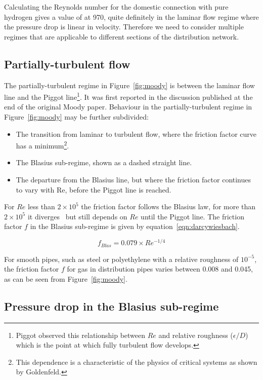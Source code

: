 \documentclass[5p]{elsarticle} %
\begin{document}
Calculating the Reynolds number for the domestic connection with pure hydrogen gives a value of at 970, quite definitely in the laminar flow regime where the pressure drop is linear in velocity.
Therefore we need to consider multiple regimes that are applicable to different sections of the distribution network.

\subsection{Partially-turbulent flow}

The partially-turbulent regime in Figure~\ref{fig:moody} is between the laminar flow line and the 
Piggot line\footnote{Piggot observed this relationship between $Re$ and relative roughness ($\epsilon/D$) which is the point at which fully turbulent flow develops.}.
It was first reported in the discussion published at the end of the original Moody paper\citep{Moody1944}. 
Behaviour in the partially-turbulent regime in Figure~\ref{fig:moody} may be further subdivided:
\begin{itemize}
    \item The transition from laminar to turbulent flow, where the friction factor curve has a minimum\footnote{This dependence is a characteristic of the physics of critical systems as shown by Goldenfeld\citep{Goldenfeld2006}.}.
    \item The Blasius sub-regime, shown as a dashed straight line.
    \item The departure from the Blasius line, but where the friction factor continues to vary with Re, before the Piggot line is reached.
\end{itemize}

For $Re$ less than $2\times10^5$ the friction factor follows the Blasius law, for more than $2\times10^5$ it diverges~\cite{Allen2007} but still depends on $Re$ until the Piggot line.
The friction factor $f$ in the Blasius sub-regime is given by equation~\eqref{eqn:darcywiesbach}\citep{Bennet2017}.

\begin{equation}
\label{eqn:blasius}
f_{Blas} = 0.079 \times Re^{-1/4}
\end{equation}

For smooth pipes, such as steel or polyethylene with a relative roughness of $10^{-5}$, the friction factor $f$ for gas in distribution pipes varies between 0.008 and 0.045, as can be seen from Figure~\ref{fig:moody}.

\subsection{Pressure drop in the Blasius sub-regime}
\label{sec:pressuredrop}
\end{document}
